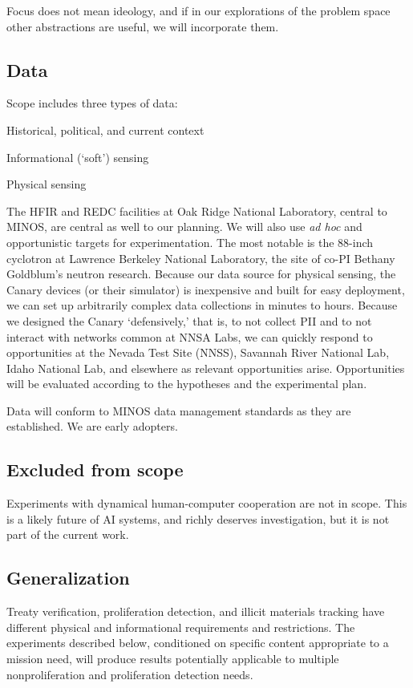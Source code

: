 \documentclass{article} %
\begin{document}
Focus does not mean ideology, and if in our explorations of the problem space other abstractions are useful, we will incorporate them.

\subsection{Data}
Scope includes three types of data:
\begin{itemize*}
\item Historical, political, and current context
\item Informational (`soft') sensing
\item Physical sensing
\end{itemize*}

The HFIR and REDC facilities at Oak Ridge National Laboratory, central to MINOS, are central as well to our planning. We will also use \textit{ad hoc} and opportunistic targets for experimentation. The most notable is the 88-inch cyclotron at Lawrence Berkeley National Laboratory, the site of co-PI Bethany Goldblum's neutron research. Because our data source for physical sensing, the Canary devices (or their simulator) is inexpensive and built for easy deployment, we can set up arbitrarily complex data collections in minutes to hours. Because we designed the Canary `defensively,' that is, to not collect PII and to not interact with networks common at NNSA Labs, we can quickly respond to opportunities at the Nevada Test Site (NNSS), Savannah River National Lab, Idaho National Lab, and elsewhere as relevant opportunities arise. Opportunities will be evaluated according to the hypotheses and the experimental plan.

Data will conform to MINOS data management standards as they are established. We are early adopters.

\subsection{Excluded from scope}
Experiments with dynamical human-computer cooperation are not in scope. This is a likely future of AI systems, and richly deserves investigation, but it is not part of the current work.

\subsection{Generalization}
Treaty verification, proliferation detection, and illicit materials tracking have different physical and informational requirements and restrictions. The experiments described below, conditioned on specific content appropriate to a mission need, will produce results potentially applicable to multiple nonproliferation and proliferation detection needs.
\end{document}
